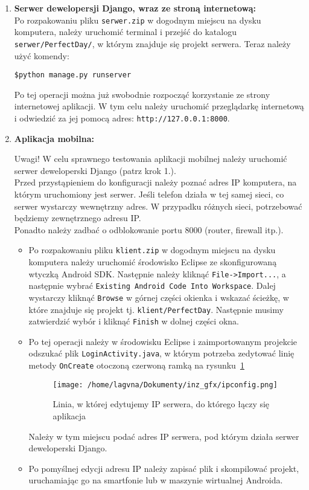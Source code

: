 \documentclass[12pt,titlepage]{article}
\begin{document}
\begin{enumerate}
 \item \textbf{Serwer dewelopersji Django, wraz ze stroną internetową:}
 \\Po rozpakowaniu pliku \verb|serwer.zip| w dogodnym miejscu na dysku komputera, należy uruchomić terminal i przejść do katalogu \verb|serwer/PerfectDay/|, w którym znajduje się projekt serwera.
 Teraz należy użyć komendy:
 \begin{center}
  \verb|$python manage.py runserver|
 \end{center}
Po tej operacji można już swobodnie rozpocząć korzystanie ze strony internetowej aplikacji.
W tym celu należy uruchomić przeglądarkę internetową i odwiedzić za jej pomocą adres: \verb|http://127.0.0.1:8000|.
\newpage
\item \textbf{Aplikacja mobilna:}
\begin{beamerlikethm}{Uwagi!}
W celu sprawnego testowania aplikacji mobilnej należy uruchomić serwer deweloperski Django (patrz krok 1.).
\\Przed przystąpieniem do konfiguracji należy poznać adres IP komputera, na którym uruchomiony jest serwer. Jeśli telefon działa w tej samej sieci, co serwer wystarczy wewnętrzny adres.
W przypadku różnych sieci, potrzebować będziemy zewnętrznego adresu IP.
\\Ponadto należy zadbać o odblokowanie portu 8000 (router, firewall itp.).
\end{beamerlikethm}

\begin{itemize}
 \item Po rozpakowaniu pliku \verb|klient.zip| w dogodnym miejscu na dysku komputera należy uruchomić środowisko Eclipse ze skonfigurowaną wtyczką Android SDK.
Następnie należy kliknąć \verb|File->Import...|, a następnie wybrać \verb|Existing Android Code Into Workspace|. Dalej wystarczy kliknąć \verb|Browse| w górnej części okienka i wskazać ścieżkę, 
w które znajduje się projekt tj. \verb|klient/PerfectDay|. Następnie musimy zatwierdzić wybór i kliknąć \verb|Finish| w dolnej części okna.
\item Po tej operacji należy w środowisku Eclipse i zaimportowanym projekcie odszukać plik \verb|LoginActivity.java|, w którym potrzeba zedytować linię metody \verb|OnCreate|
otoczoną czerwoną ramką na rysunku~\ref{fig:ip}
\begin{figure}[htb]
\begin{center}
 \texttt{[image: /home/lagvna/Dokumenty/inz\_gfx/ipconfig.png]}
 \caption{Linia, w której edytujemy IP serwera, do którego łączy się aplikacja}
 \label{fig:ip}
 \end{center}
\end{figure}

Należy w tym miejscu podać adres IP serwera, pod którym działa serwer deweloperski Django.

\item Po pomyślnej edycji adresu IP należy zapisać plik i skompilować projekt, uruchamiając go na smartfonie lub w maszynie wirtualnej Androida.
\end{itemize}

\end{enumerate}
\end{document}
